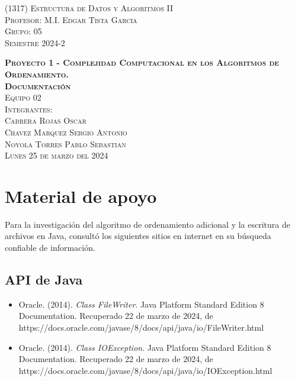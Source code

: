 \documentclass[a4paper,12pt]{article}
\begin{document}
\begin{titlepage}
\begin{minipage}[c][0.81\textheight][t]{0.75\textwidth}
\begin{center}
                {\large\scshape (1317) Estructura de Datos y Algoritmos II }\\[.2in]
                
                \textsc{\large Profesor: M.I. Edgar Tista Garcia}\\[.25cm]
                \textsc{\large Grupo: 05}\\ [.25cm]
                \textsc{\large Semestre 2024-2}\\

                \vspace{1cm}            
 
                \textsc{\large \textbf{Proyecto 1 - Complejidad Computacional en los Algoritmos de Ordenamiento.}}\\[.5cm]
                \textsc{\large \textbf{Documentación}}\\[1cm]
                \textsc{\large Equipo 02}\\ [1cm]
                \textsc{\large Integrantes:}\\[0.25cm]
                \textsc{\large Cabrera Rojas Oscar}\\[0.25cm]
                \textsc{\large Chavez Marquez Sergio Antonio}\\[0.25cm]
                \textsc{\large {Noyola Torres Pablo Sebastian}}\\[2cm]          


                \vspace{0.5cm}
                \textsc{\large Lunes 25 de marzo del 2024}\\[0.25cm]
            \end{center}
        \end{minipage}
    \end{titlepage}

\section{Material de apoyo}

Para la investigación del algoritmo de ordenamiento adicional y la escritura de archivos en Java, consultó los siguientes sitios en internet en su búsqueda confiable de información.

\subsection{API de Java}

\begin{itemize}
    \item Oracle. (2014). \textit{Class FileWriter}. Java Platform Standard Edition 8 Documentation. Recuperado 22 de marzo de 2024, de\\https://docs.oracle.com/javase/8/docs/api/java/io/FileWriter.html
    \item Oracle. (2014). \textit{Class IOException}. Java Platform Standard Edition 8 Documentation. Recuperado 22 de marzo de 2024, de\\https://docs.oracle.com/javase/8/docs/api/java/io/IOException.html
\end{itemize}
\end{document}

